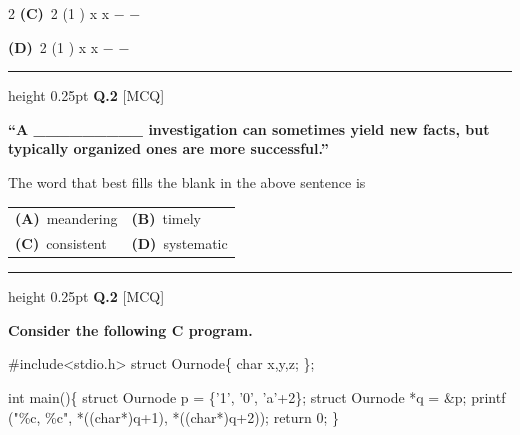 \documentclass[a4paper,10pt,twoside]{article}
\begin{document}
\begin{multicols}{2}
\textbf{(C)}~2  \newline (1 \newline ) \newline x \newline x \newline − \newline −\par\vspace{2pt}\noindent
\textbf{(D)}~2  \newline (1 \newline ) \newline x \newline x \newline − \newline −
\par\vspace{6pt}\hrule height 0.25pt\vspace{6pt}
\noindent\textbf{Q.2} \hfill {\footnotesize\textsf{[MCQ]}}
\par\vspace{2pt}
{\bfseries ``A \_\_\_\_\_\_\_\_\_ investigation can sometimes yield new facts, but typically organized ones
are more successful.''
\par\smallskip
The word that best fills the blank in the above sentence is \par}
\par\vspace{2pt}\noindent
\begin{tabular*}{\columnwidth}{@{\extracolsep{\fill}}p{}p{}@{}}
\textbf{(A)}~meandering & \textbf{(B)}~timely \\
\addlinespace[2pt]
\textbf{(C)}~consistent & \textbf{(D)}~systematic
\end{tabular*}
\par\vspace{6pt}\hrule height 0.25pt\vspace{6pt}
\noindent\textbf{Q.2} \hfill {\footnotesize\textsf{[MCQ]}}
\par\vspace{2pt}
{\bfseries Consider the following C program.
\par\smallskip
\#include<stdio.h>
struct Ournode\{
char x,y,z;
\};
\par\smallskip
int main()\{
struct Ournode p = \{'1', '0', 'a'+2\};
struct Ournode *q = \&p;
printf ("\%c, \%c", *((char*)q+1), *((char*)q+2));
return 0;
\}
\par\smallskip
}
\end{multicols}
\end{document}
